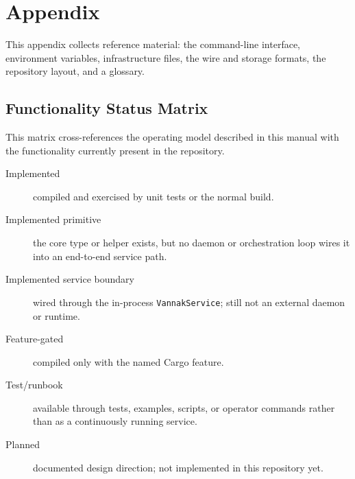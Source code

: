 \section{Appendix}
\label{sec:appendix}

This appendix collects reference material: the command-line interface,
environment variables, infrastructure files, the wire and storage formats, the
repository layout, and a glossary.

\subsection{Functionality Status Matrix}

This matrix cross-references the operating model described in this manual with
the functionality currently present in the repository.

\begin{description}
\item[Implemented] compiled and exercised by unit tests or the normal build.
\item[Implemented primitive] the core type or helper exists, but no daemon or
  orchestration loop wires it into an end-to-end service path.
\item[Implemented service boundary] wired through the in-process
  \texttt{VannakService}; still not an external daemon or \sitas{} runtime.
\item[Feature-gated] compiled only with the named Cargo feature.
\item[Test/runbook] available through tests, examples, scripts, or operator
  commands rather than as a continuously running service.
\item[Planned] documented design direction; not implemented in this repository
  yet.
\end{description}

